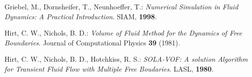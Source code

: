 \documentclass[a4paper, 12pt]{article}
\begin{document}
\begin{thebibliography}{99}
Griebel, M., Dornsheifer, T., Neunhoeffer, T.: \emph{Numerical Simulation in
Fluid Dynamics: A Practical Introduction}. SIAM, {\bf 1998}.

Hirt, C. W., Nichols, B. D.: \emph{Volume of Fluid Method for the Dynamics of Free Boundaries}. Journal of Computational Physics {\bf 39} (1981).

Hirt, C. W., Nichols, B. D., Hotchkiss, R. S.: \emph{SOLA-VOF: A solution Algorithm for Transient Fluid Flow with Multiple Free Boudaries}. LASL, {\bf 1980}.
\end{thebibliography}
\end{document}

